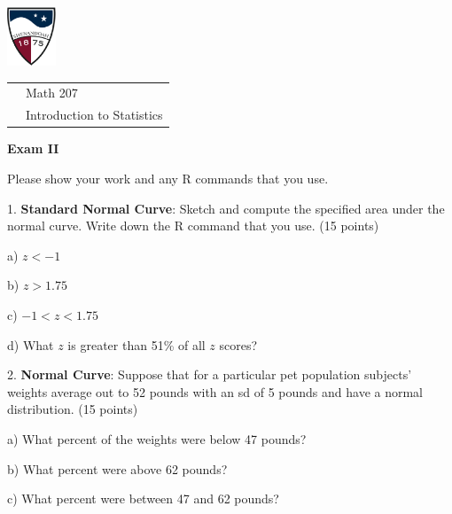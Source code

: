 \documentclass[10pt]{article}
\begin{document}
\pagestyle{empty}
\href{http://www.su.edu}{\includegraphics[height=1.75cm]{sulogo.eps}}
\vspace{-1.69cm}

\hfill {\small
\begin{tabular}{cl}
& Math 207\\
& Introduction to Statistics\\
\end{tabular}
}
\setlength{\baselineskip}{1.05\baselineskip}
\bigskip

\begin{center}
\textbf{\large  Exam II}
\end{center}
Please show your work and any R commands that you use.
\medskip


1. \textbf{Standard Normal Curve}:  Sketch and compute the specified area under the normal curve. 
Write down the R command that you use. (15 points)

\hspace{10pt} a) $z < -1$
\vspace{.4in}

\hspace{10pt} b) $z > 1.75$
\vspace{.5in}

\hspace{10pt} c) $-1 < z < 1.75$
\vspace{.5in}

\hspace{10pt} d) What $z$ is greater than 51\% of all $z$ scores?
\vspace{.5in}

2. \textbf{Normal Curve}:  Suppose that for a particular pet population
subjects' weights average out to 52 pounds with an sd of 5 pounds and have
a normal distribution. (15 points)

\hspace{10pt} a) What percent of the weights were below 47 pounds?
\vspace{.9in}

\hspace{10pt} b) What percent were above 62 pounds?
\vspace{.9in}

\hspace{10pt} c) What percent were between 47 and 62 pounds?
\vspace{.9in}
\end{document}
